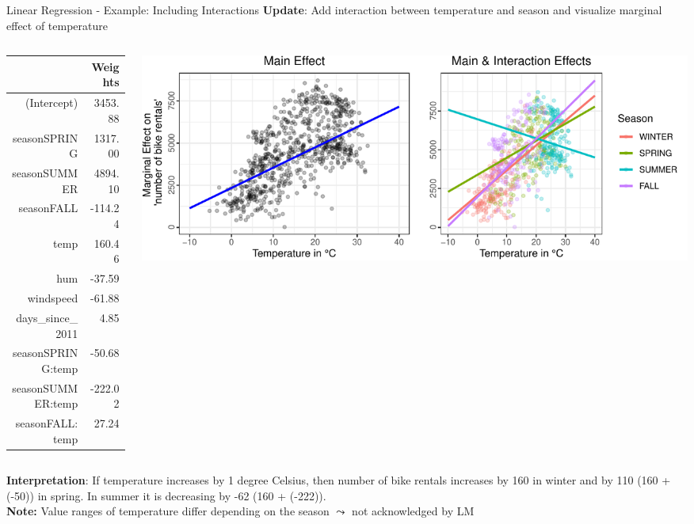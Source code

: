 \documentclass[11pt,compress,t,notes=noshow, aspectratio=169, xcolor=table]{beamer}
\begin{document}
\begin{frame}{Linear Regression - Example: Including Interactions}
\textbf{Update}: Add interaction between temperature and season and visualize marginal effect of temperature%
\begin{columns}[T]
\begin{column}{0.25\textwidth}
\begin{tiny}
\begin{table}[ht]
\centering
\begin{tabular}{rr}
  \hline
 & Weights \\ 
  \hline
(Intercept) & 3453.88 \\ 
  seasonSPRING & 1317.00 \\ 
  seasonSUMMER & 4894.10 \\ 
  seasonFALL & -114.24 \\ 
  temp & 160.46 \\ 
  hum & -37.59 \\ 
  windspeed & -61.88 \\ 
  days\_since\_2011 & 4.85 \\ 
  seasonSPRING:temp & -50.68 \\ 
  seasonSUMMER:temp & -222.02 \\ 
  seasonFALL:temp & 27.24 \\ 
   \hline
\end{tabular}
\end{table}
\end{tiny}
\end{column}
\begin{column}{0.7\textwidth}
\includegraphics[width = \textwidth]{figure/lm_main_vs_interaction_effects.pdf}
\end{column}
\end{columns}
\vfill
\pause
\textbf{Interpretation}: If temperature increases by 1 degree Celsius, then number of bike rentals increases by 160 in winter and by 110 (160 + (-50)) in spring. In summer it is decreasing by -62 (160 + (-222)).\\\vspace*{0.2cm}
\textbf{Note:} Value ranges of temperature differ depending on the season $\leadsto$ not acknowledged by LM
\end{frame}
\end{document}
